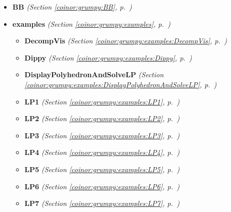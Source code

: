 \begin{itemize}
\setlength{\parskip}{0ex}
\item \textbf{BB}
  \textit{(Section \ref{coinor:grumpy:BB}, p.~\pageref{coinor:grumpy:BB})}

\item \textbf{examples}
  \textit{(Section \ref{coinor:grumpy:examples}, p.~\pageref{coinor:grumpy:examples})}

  \begin{itemize}
\setlength{\parskip}{0ex}
    \item \textbf{DecompVis}
  \textit{(Section \ref{coinor:grumpy:examples:DecompVis}, p.~\pageref{coinor:grumpy:examples:DecompVis})}

    \item \textbf{Dippy}
  \textit{(Section \ref{coinor:grumpy:examples:Dippy}, p.~\pageref{coinor:grumpy:examples:Dippy})}

    \item \textbf{DisplayPolyhedronAndSolveLP}
  \textit{(Section \ref{coinor:grumpy:examples:DisplayPolyhedronAndSolveLP}, p.~\pageref{coinor:grumpy:examples:DisplayPolyhedronAndSolveLP})}

    \item \textbf{LP1}
  \textit{(Section \ref{coinor:grumpy:examples:LP1}, p.~\pageref{coinor:grumpy:examples:LP1})}

    \item \textbf{LP2}
  \textit{(Section \ref{coinor:grumpy:examples:LP2}, p.~\pageref{coinor:grumpy:examples:LP2})}

    \item \textbf{LP3}
  \textit{(Section \ref{coinor:grumpy:examples:LP3}, p.~\pageref{coinor:grumpy:examples:LP3})}

    \item \textbf{LP4}
  \textit{(Section \ref{coinor:grumpy:examples:LP4}, p.~\pageref{coinor:grumpy:examples:LP4})}

    \item \textbf{LP5}
  \textit{(Section \ref{coinor:grumpy:examples:LP5}, p.~\pageref{coinor:grumpy:examples:LP5})}

    \item \textbf{LP6}
  \textit{(Section \ref{coinor:grumpy:examples:LP6}, p.~\pageref{coinor:grumpy:examples:LP6})}

    \item \textbf{LP7}
  \textit{(Section \ref{coinor:grumpy:examples:LP7}, p.~\pageref{coinor:grumpy:examples:LP7})}


\end{itemize}
\end{itemize}
